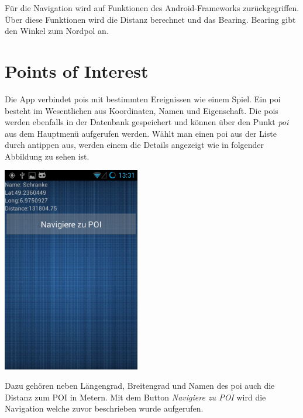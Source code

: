 Für die Navigation wird auf Funktionen des Android-Frameworks zurückgegriffen. Über diese Funktionen wird die Distanz berechnet und das Bearing. Bearing gibt den Winkel zum Nordpol an.

\section{Points of Interest}
Die App verbindet \glspl{poi} mit bestimmten Ereignissen wie einem Spiel. Ein \gls{poi} besteht im Wesentlichen aus Koordinaten, Namen und Eigenschaft.  Die \glspl{poi} werden ebenfalls in der Datenbank gespeichert und können über den Punkt \textit{\gls{poi}} aus dem Hauptmenü aufgerufen werden. Wählt man einen \gls{poi} aus der Liste durch antippen aus, werden einem die Details angezeigt wie in folgender Abbildung zu sehen ist.
\begin{capfigure}
	\includegraphics[width=6cm]{images/app/poidetail}
\end{capfigure}
Dazu gehören neben Längengrad, Breitengrad und Namen des \gls{poi} auch die Distanz zum POI in Metern. Mit dem Button \textit{Navigiere zu POI} wird die Navigation welche zuvor beschrieben wurde aufgerufen.

